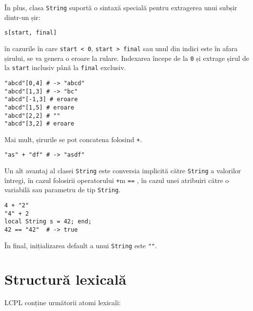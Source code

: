 \documentclass[12pt]{article}
\begin{document}
În plus, clasa \texttt{String} suportă o sintaxă specială pentru extragerea unui subșir dintr-un șir:

\begin{verbatim}
s[start, final]
\end{verbatim}

în cazurile în care \texttt{start < 0}, \texttt{start > final} sau unul din indici este în afara șirului, se va genera o eroare la rulare. Indexarea începe de la \texttt{0} și extrage șirul de la \texttt{start} inclusiv până la \texttt{final} exclusiv.

\begin{verbatim}
"abcd"[0,4] # -> "abcd"
"abcd"[1,3] # -> "bc"
"abcd"[-1,3] # eroare
"abcd"[1,5] # eroare
"abcd"[2,2] # ""
"abcd"[3,2] # eroare
\end{verbatim}


Mai mult, șirurile se pot concatena folosind \texttt{+}.

\begin{verbatim}
"as" + "df" # -> "asdf"
\end{verbatim}

Un alt avantaj al clasei \texttt{String} este conversia implicită către \texttt{String} a valorilor întregi, în cazul folosirii operatorului \texttt{+}m \texttt{==} , în cazul unei atribuiri către o variabilă sau parametru de tip \texttt{String}.

\begin{verbatim}
4 + "2"
"4" + 2
local String s = 42; end;
42 == "42"  # -> true
\end{verbatim}

În final, inițializarea default a unui \texttt{String} este \texttt{""}.

\section{Structură lexicală}

LCPL conține următorii atomi lexicali:
\end{document}

